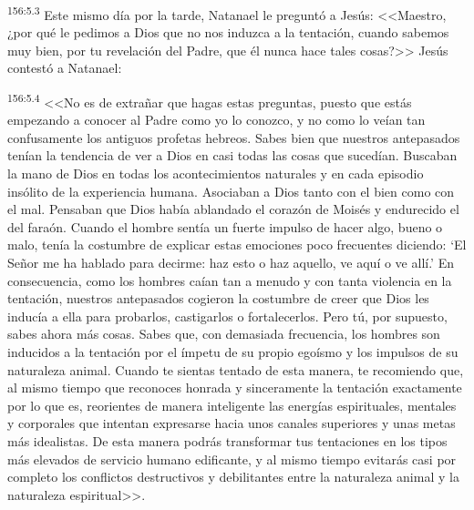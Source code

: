 \par 
\textsuperscript{156:5.3} Este mismo día por la tarde, Natanael le preguntó a Jesús: <<Maestro, ¿por qué le pedimos a Dios que no nos induzca a la tentación, cuando sabemos muy bien, por tu revelación del Padre, que él nunca hace tales cosas?>> Jesús contestó a Natanael:

\par 
\textsuperscript{156:5.4} <<No es de extrañar que hagas estas preguntas, puesto que estás empezando a conocer al Padre como yo lo conozco, y no como lo veían tan confusamente los antiguos profetas hebreos. Sabes bien que nuestros antepasados tenían la tendencia de ver a Dios en casi todas las cosas que sucedían. Buscaban la mano de Dios en todas los acontecimientos naturales y en cada episodio insólito de la experiencia humana. Asociaban a Dios tanto con el bien como con el mal. Pensaban que Dios había ablandado el corazón de Moisés y endurecido el del faraón. Cuando el hombre sentía un fuerte impulso de hacer algo, bueno o malo, tenía la costumbre de explicar estas emociones poco frecuentes diciendo: `El Señor me ha hablado para decirme: haz esto o haz aquello, ve aquí o ve allí.' En consecuencia, como los hombres caían tan a menudo y con tanta violencia en la tentación, nuestros antepasados cogieron la costumbre de creer que Dios les inducía a ella para probarlos, castigarlos o fortalecerlos. Pero tú, por supuesto, sabes ahora más cosas. Sabes que, con demasiada frecuencia, los hombres son inducidos a la tentación por el ímpetu de su propio egoísmo y los impulsos de su naturaleza animal. Cuando te sientas tentado de esta manera, te recomiendo que, al mismo tiempo que reconoces honrada y sinceramente la tentación exactamente por lo que es, reorientes de manera inteligente las energías espirituales, mentales y corporales que intentan expresarse hacia unos canales superiores y unas metas más idealistas. De esta manera podrás transformar tus tentaciones en los tipos más elevados de servicio humano edificante, y al mismo tiempo evitarás casi por completo los conflictos destructivos y debilitantes entre la naturaleza animal y la naturaleza espiritual>>.

